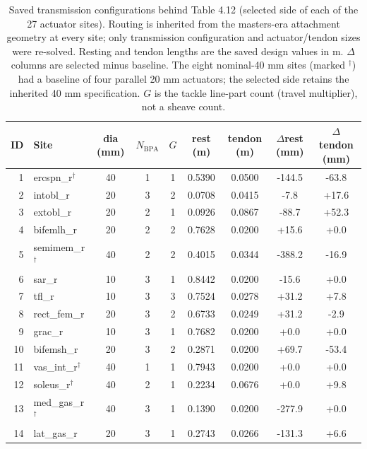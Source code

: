 \begin{table}[htbp]
\centering
\caption{Saved transmission configurations behind Table 4.12 (selected side of each of the 27 actuator sites). Routing is inherited from the masters-era attachment geometry at every site; only transmission configuration and actuator/tendon sizes were re-solved. Resting and tendon lengths are the saved design values in m. $\Delta$ columns are selected minus baseline. The eight nominal-40 mm sites (marked $^{\dagger}$) had a baseline of four parallel 20 mm actuators; the selected side retains the inherited 40 mm specification. $G$ is the tackle line-part count (travel multiplier), not a sheave count.}
\label{tab:wholeleg_saved_configurations}
\footnotesize
\begin{tabular}{rlccccccc}
\toprule
ID & Site & dia (mm) & $N_\mathrm{BPA}$ & $G$ & rest (m) & tendon (m) & $\Delta$rest (mm) & $\Delta$tendon (mm)\\
\midrule
1 & ercspn\_r$^{\dagger}$ & 40 & 1 & 1 & 0.5390 & 0.0500 & -144.5 & -63.8 \\
2 & intobl\_r & 20 & 3 & 2 & 0.0708 & 0.0415 & -7.8 & +17.6 \\
3 & extobl\_r & 20 & 2 & 1 & 0.0926 & 0.0867 & -88.7 & +52.3 \\
4 & bifemlh\_r & 20 & 2 & 2 & 0.7628 & 0.0200 & +15.6 & +0.0 \\
5 & semimem\_r$^{\dagger}$ & 40 & 2 & 2 & 0.4015 & 0.0344 & -388.2 & -16.9 \\
6 & sar\_r & 10 & 3 & 1 & 0.8442 & 0.0200 & -15.6 & +0.0 \\
7 & tfl\_r & 10 & 3 & 3 & 0.7524 & 0.0278 & +31.2 & +7.8 \\
8 & rect\_fem\_r & 20 & 3 & 2 & 0.6733 & 0.0249 & +31.2 & -2.9 \\
9 & grac\_r & 10 & 3 & 1 & 0.7682 & 0.0200 & +0.0 & +0.0 \\
10 & bifemsh\_r & 20 & 3 & 2 & 0.2871 & 0.0200 & +69.7 & -53.4 \\
11 & vas\_int\_r$^{\dagger}$ & 40 & 1 & 1 & 0.7943 & 0.0200 & +0.0 & +0.0 \\
12 & soleus\_r$^{\dagger}$ & 40 & 2 & 1 & 0.2234 & 0.0676 & +0.0 & +9.8 \\
13 & med\_gas\_r$^{\dagger}$ & 40 & 3 & 1 & 0.1390 & 0.0200 & -277.9 & +0.0 \\
14 & lat\_gas\_r & 20 & 3 & 1 & 0.2743 & 0.0266 & -131.3 & +6.6 \\

\end{tabular}
\end{table}
